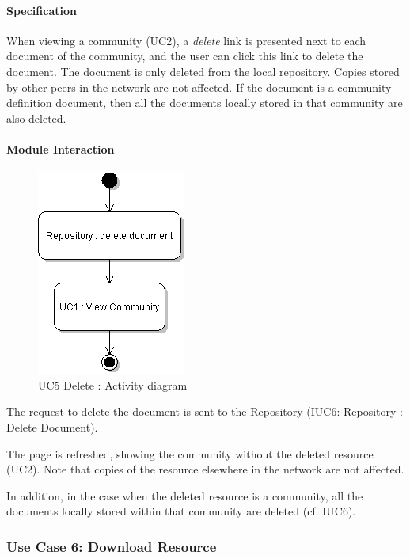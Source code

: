 \documentclass[titlepage]{article}%
\begin{document}
\paragraph{Specification}
When viewing a community (UC2), a \emph{delete} link is presented next to each document of the community, and the user can click this link to delete the document. The document is only deleted from the local repository. Copies stored by other peers in the network are not affected. If the document is a community definition document, then all the documents locally stored in that community are also deleted.

\paragraph{Module Interaction}

\begin{figure}[htb]
\centering
	\includegraphics[scale=0.5]{diagrams/uc6-delete.png}
	\caption{UC5 Delete : Activity diagram}
	\label{fig:uc5}
\end{figure}

The request to delete the document is sent to the Repository (IUC6: Repository : Delete Document).

The page is refreshed, showing the community without the deleted resource (UC2). Note that copies of the resource elsewhere in the network are not affected.

In addition, in the case when the deleted resource is a community, all the documents locally stored within that community are deleted (cf. IUC6).

\subsubsection{Use Case 6: Download Resource} 
\label{uc6}
\end{document}
